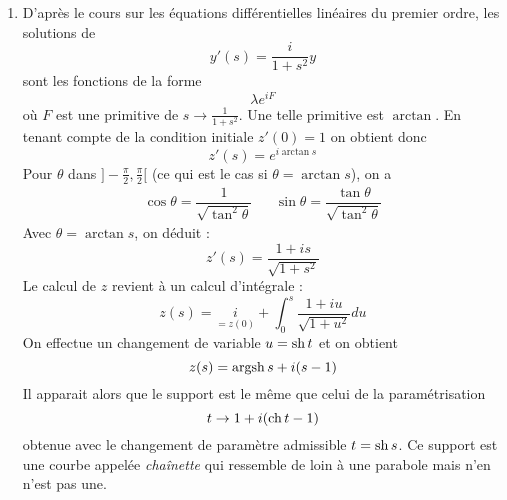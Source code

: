 \begin{enumerate}
\begin{enumerate}
\item D'après le cours sur les équations différentielles linéaires du premier ordre, les solutions de
\begin{displaymath}
 y'(s) = \dfrac{i}{1+s^2}y
\end{displaymath}
 sont les fonctions de la forme
\begin{displaymath}
 \lambda e^{iF}
\end{displaymath}
où $F$ est une primitive de $s\rightarrow \frac{1}{1+s^2}$. Une telle primitive est $\arctan$. En tenant compte de la condition initiale $z'(0)=1$ on obtient donc
\begin{displaymath}
 z'(s)=e^{i\arctan s}
\end{displaymath}
Pour $\theta$ dans $]-\frac{\pi}{2}, \frac{\pi}{2}[$ (ce qui est le cas si $\theta=\arctan s$), on a
\begin{align*}
 \cos \theta = \dfrac{1}{\sqrt{\tan^2 \theta}}  & & 
\sin \theta = \dfrac{\tan \theta}{\sqrt{\tan^2 \theta}}
\end{align*}
Avec $\theta=\arctan s$, on déduit :
\begin{displaymath}
 z'(s)=\dfrac{1+is}{\sqrt{1+s^2}}
\end{displaymath}
Le calcul de $z$ revient à un calcul d'intégrale :
\begin{displaymath}
 z(s)= \underset{=z(0)}{i}
+\int_{0}^{s}\dfrac{1+iu}{\sqrt{1+u^2}} du
\end{displaymath}
On effectue un changement de variable $u=\operatorname{sh} t$ et on obtient
\begin{displaymath}
 z(s)= \operatorname{argsh} s +i(s-1)
\end{displaymath}
Il apparait alors que le support est le même que celui de la paramétrisation
\begin{displaymath}
 t \rightarrow 1 +i(\operatorname{ch} t -1)
\end{displaymath}
obtenue avec le changement de paramètre admissible $t=\operatorname{sh} s$.\newline
Ce support est une courbe appelée \emph{chaînette} qui ressemble de loin à une parabole mais n'en n'est pas une.
\end{enumerate}
 

\end{enumerate}
